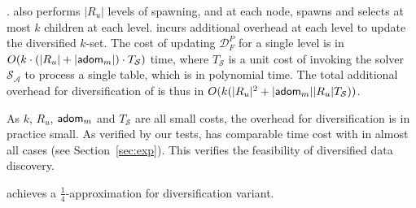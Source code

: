 {. 
\divmodis also performs 
$|R_u|$ levels of  
spawning, and at each node, 
spawns and selects at most $k$ 
children at each level. 
\divmodis incurs additional overhead at each 
level to update the diversified $k$-set. 
The cost of updating $\mathcal{D}_F^{P}$ for a single level is in
$O(k \cdot (|R_u| + |{\mathsf{adom}}_m|) \cdot T_{\mathcal{S}})$ 
time, where $T_{\mathcal{S}}$
is a unit cost of invoking the solver $\mathcal{S}_{\mathcal{A}}$ to process a single 
table, which is in polynomial time. 
The total additional overhead for 
diversification of \divmodis 
is thus in $O(k(|R_u|^2 + |{\mathsf{adom}}_m||R_u|T_{\mathcal{S}}))$. 

As $k$, $R_u$, ${\mathsf{adom}}_m$ and $T_{\mathcal{S}}$ 
are all small costs, the overhead for diversification 
is in practice small. As verified by our tests, \divmodis has comparable time cost with 
\bimodis in almost all cases (see Section~\ref{sec:exp}). 
This verifies the feasibility of diversified 
data discovery. 



\begin{lemma} 
\label{lemma:div}
\divmodis achieves a $\frac{1}{4}$-approximation for \modis diversification variant.
\end{lemma}
\eat{
\begin{proof}
\end{proof}
}
}


